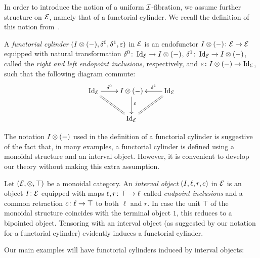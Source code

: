 \documentclass[reqno,10pt,a4paper,oneside,draft]{amsart}
\begin{document}
In order to introduce the notion of a uniform $\cal{I}$-fibration, we assume further structure on $\catE$, namely that of a functorial cylinder. We recall the definition of this notion from~\cite{kamps-porter:homotopy}.

\begin{definition}
A \emph{functorial cylinder} $(\interval \otimes (-), \lcyl, \rcyl, \ccyl)$ in $\calE$ is an endofunctor $\interval \otimes (-) \co \catE \to \catE$ equipped with natural transformation $\lcyl \co \Id_\catE \to \interval \otimes (-)$, $\rcyl \co \Id_\catE \to \interval \otimes (-)$, called the \emph{right and left endopoint inclusions}, respectively, and $\ccyl \co \interval \otimes (-) \to \Id_\catE$, such that the following diagram commute:
\[
\xymatrix{
  \Id_\catE \ar[r]^-{\lcyl} \ar@{=}[dr] & \interval \otimes (-) \ar[d]^-(.4){\ccyl} & \Id_\catE \ar@{=}[dl] \ar[l]_-{\rcyl} \\
  & \Id_\catE
}
\]
\end{definition}

The notation $\interval \otimes (-)$ used in the definition of a functorial cylinder is suggestive of the fact that, in many examples, a functorial cylinder is defined using a monoidal structure and an interval object.
However, it is convenient to develop our theory without making this extra assumption.

\begin{example} \label{exa:cyl-via-int}
Let $(\catE, \otimes, \top)$ be a monoidal category.
An \emph{interval object} $(\interval, \ell, r, c)$ in $\calE$ is an object $\interval \co \catE$ equipped with maps $\ell, r \co \top \to \intervall$ called \emph{endpoint inclusions} and a common retraction $c \co \intervall \to \top$ to both $\ell$ and $r$.
In case the unit $\top$ of the monoidal structure coincides with the terminal object $1$, this reduces to a bipointed object.
Tensoring with an interval object (as suggested by our notation for a functorial cylinder) evidently induces a functorial cylinder.
\end{example}

Our main examples will have functorial cylinders induced by interval objects:
\end{document}
